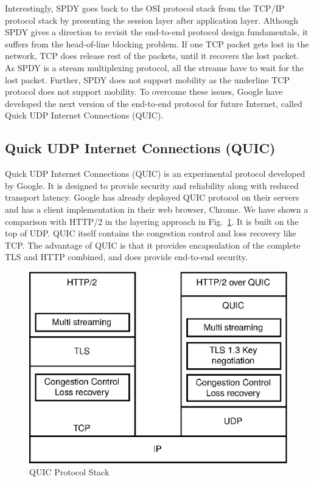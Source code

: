 Interestingly, SPDY goes back to the OSI protocol stack from the TCP/IP protocol stack by presenting the session layer after application layer. Although SPDY gives a direction to revisit the end-to-end protocol design fundamentals, it suffers from the head-of-line blocking problem. If one TCP packet gets lost in the network, TCP does release rest of the packets, until it recovers the lost packet. As SPDY is a stream multiplexing protocol, all the streams have to wait for the lost packet. Further, SPDY does not support mobility as the underline TCP protocol does not support mobility. To overcome these issues, Google have developed the next version of the end-to-end protocol for future Internet, called Quick UDP Internet Connections (QUIC).

\subsection{Quick UDP Internet Connections (QUIC)}
Quick UDP Internet Connections (QUIC) is an experimental protocol developed by Google. It is designed to provide
security and reliability along with reduced transport latency. Google has already deployed QUIC protocol on their servers and has a client implementation in their web browser, Chrome. We have shown a comparison with HTTP/2 in the layering approach in Fig.~\ref{fig:quic-protocolstack}. It is built on the top of UDP. QUIC itself contains the congestion control and loss recovery like TCP. The advantage of QUIC is that it provides encapsulation of the complete TLS and HTTP combined, and does provide end-to-end security.

\begin{figure}[!ht]
    \centering
    \includegraphics[width=0.6\linewidth]{img/quic/quic-protocolstack}
    \caption{QUIC Protocol Stack}
    \label{fig:quic-protocolstack}
\end{figure}

